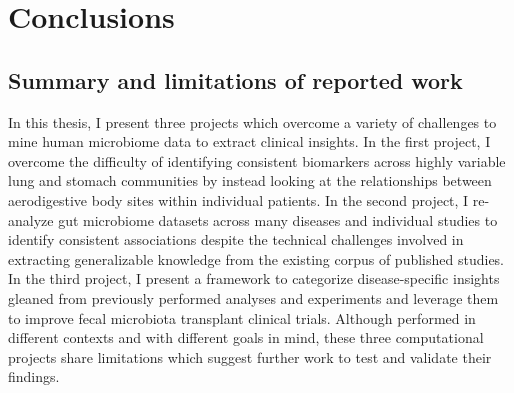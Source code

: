 \chapter{Conclusions}

\section{Summary and limitations of reported work}

In this thesis, I present three projects which overcome a variety of challenges to mine human microbiome data to extract clinical insights.
In the first project, I overcome the difficulty of identifying consistent biomarkers across highly variable lung and stomach communities by instead looking at the relationships between aerodigestive body sites within individual patients.
In the second project, I re-analyze gut microbiome datasets across many diseases and individual studies to identify consistent associations despite the technical challenges involved in extracting generalizable knowledge from the existing corpus of published studies.
In the third project, I present a framework to categorize disease-specific insights gleaned from previously performed analyses and experiments and leverage them to improve fecal microbiota transplant clinical trials.
Although performed in different contexts and with different goals in mind, these three computational projects share limitations which suggest further work to test and validate their findings.

